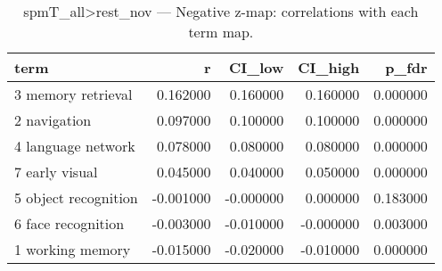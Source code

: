 \begin{table}
\caption{spmT_all>rest_nov — Negative z-map: correlations with each term map.}
\label{tab:spmT_all>rest_nov_neg}
\begin{tabular}{lrrrr}
\toprule
term & r & CI\_low & CI\_high & p\_fdr \\
\midrule
3 memory retrieval & 0.162000 & 0.160000 & 0.160000 & 0.000000 \\
2 navigation & 0.097000 & 0.100000 & 0.100000 & 0.000000 \\
4 language network & 0.078000 & 0.080000 & 0.080000 & 0.000000 \\
7 early visual & 0.045000 & 0.040000 & 0.050000 & 0.000000 \\
5 object recognition & -0.001000 & -0.000000 & 0.000000 & 0.183000 \\
6 face recognition & -0.003000 & -0.010000 & -0.000000 & 0.003000 \\
1 working memory & -0.015000 & -0.020000 & -0.010000 & 0.000000 \\
\bottomrule
\end{tabular}
\end{table}
